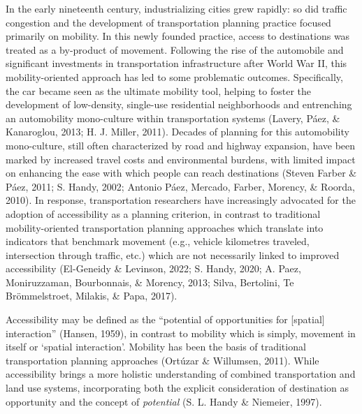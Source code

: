 \documentclass[
11pt, %
oneside, %
english, %
singlespacing, %
]{macthesis} %
\begin{document}
In the early nineteenth century, industrializing cities grew rapidly: so did traffic congestion and the development of transportation planning practice focused primarily on mobility. In this newly founded practice, access to destinations was treated as a by-product of movement. Following the rise of the automobile and significant investments in transportation infrastructure after World War II, this mobility-oriented approach has led to some problematic outcomes. Specifically, the car became seen as the ultimate mobility tool, helping to foster the development of low-density, single-use residential neighborhoods and entrenching an automobility mono-culture within transportation systems (Lavery, Páez, \& Kanaroglou, 2013; H. J. Miller, 2011). Decades of planning for this automobility mono-culture, still often characterized by road and highway expansion, have been marked by increased travel costs and environmental burdens, with limited impact on enhancing the ease with which people can reach destinations (Steven Farber \& Páez, 2011; S. Handy, 2002; Antonio Páez, Mercado, Farber, Morency, \& Roorda, 2010). In response, transportation researchers have increasingly advocated for the adoption of accessibility as a planning criterion, in contrast to traditional mobility-oriented transportation planning approaches which translate into indicators that benchmark movement (e.g., vehicle kilometres traveled, intersection through traffic, etc.) which are not necessarily linked to improved accessibility (El-Geneidy \& Levinson, 2022; S. Handy, 2020; A. Paez, Moniruzzaman, Bourbonnais, \& Morency, 2013; Silva, Bertolini, Te Brömmelstroet, Milakis, \& Papa, 2017).

Accessibility may be defined as the ``potential of opportunities for {[}spatial{]} interaction'' (Hansen, 1959), in contrast to mobility which is simply, movement in itself or `spatial interaction'. Mobility has been the basis of traditional transportation planning approaches (Ortúzar \& Willumsen, 2011). While accessibility brings a more holistic understanding of combined transportation and land use systems, incorporating both the explicit consideration of destination as opportunity and the concept of \emph{potential} (S. L. Handy \& Niemeier, 1997).
\end{document}
